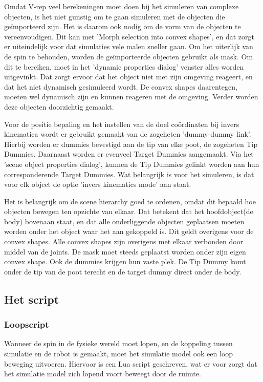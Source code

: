 \documentclass[10pt,a4paper]{article}
\begin{document}
Omdat V-rep veel berekeningen moet doen bij het simuleren van complexe objecten, is het niet gunstig om te gaan simuleren met de objecten die ge\"importeerd zijn. Het is daarom ook nodig om de vorm van de objecten te vereenvoudigen. Dit kan met 'Morph selection into convex shapes', en dat zorgt er uiteindelijk voor dat simulaties vele malen sneller gaan. 
Om het uiterlijk van de spin te behouden, worden de ge\"importeerde objecten gebruikt als mask. Om dit te bereiken, moet in het 'dynamic properties dialog' venster alles worden uitgevinkt. Dat zorgt ervoor dat het object niet met zijn omgeving reageert, en dat het niet dynamisch gesimuleerd wordt.
De convex shapes daarentegen, moeten wel dynamisch zijn en kunnen reageren met de omgeving. Verder worden deze objecten doorzichtig gemaakt.

Voor de positie bepaling en het instellen van de doel co\"ordinaten bij invers kinematica wordt er gebruikt gemaakt van de zogeheten 'dummy-dummy link'. Hierbij worden er dummies bevestigd aan de tip van elke poot, de zogeheten Tip Dummies. Daarnaast worden er evenveel Target Dummies aangemaakt. Via het 'scene object properties dialog', kunnen de Tip Dummies gelinkt worden aan hun corresponderende Target Dummies. Wat belangrijk is voor het simuleren, is dat voor elk object de optie 'invers kinematics mode' aan staat.

Het is belangrijk om de scene hierarchy goed te ordenen, omdat dit bepaald hoe objecten bewegen ten opzichte van elkaar. Dat betekent dat het hoofdobject(de body) bovenaan staat, en dat alle onderliggende objecten geplaatsen moeten worden onder het object waar het aan gekoppeld is. Dit geldt overigens voor de convex shapes. Alle convex shapes zijn overigens met elkaar verbonden door middel van de joints. De mask moet steeds geplaatst worden onder zijn eigen convex shape. Ook de dummies krijgen hun vaste plek. De Tip Dummy komt onder de tip van de poot terecht en de target dummy direct onder de body.


\subsection{Het script}

\subsubsection{Loopscript}
Wanneer de spin in de fysieke wereld moet lopen, en de koppeling tussen simulatie en de robot is gemaakt, moet het simulatie model ook een loop beweging uitvoeren. Hiervoor is een Lua script geschreven, wat er voor zorgt dat het simulatie model zich lopend voort beweegt door de ruimte.
\end{document}
